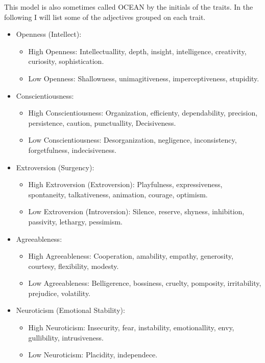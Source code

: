 This model is also sometimes called OCEAN by the initials of the traits. In the following I will list some of the adjectives grouped on each trait.

\begin{itemize}
\item Openness (Intellect):
	\begin{itemize}
	    \item High Openness: Intellectuallity, depth, insight, intelligence, creativity, curiosity, sophistication.
	    \item Low Openness: Shallowness, unimagitiveness, imperceptiveness, stupidity.
	\end{itemize}
\item Conscientiousness:
	\begin{itemize}
	    \item High Conscientiousness: Organization, efficienty, dependability, precision, persistence, caution, punctuallity, Decisiveness.
	    \item Low Conscientiousness: Desorganization, negligence, inconsistency, forgetfulness, indecisiveness. 
	\end{itemize}
\item Extroversion (Surgency):
	\begin{itemize}
	    \item High Extroversion (Extroversion): Playfulness, expressiveness, spontaneity, talkativeness, animation, courage, optimism.
	    \item Low Extroversion (Introversion): Silence, reserve, shyness, inhibition, passivity, lethargy, pessimism.
	\end{itemize}
\item Agreeableness:
	\begin{itemize}
	    \item High Agreeableness: Cooperation, amability, empathy, generosity, courtesy, flexibility, modesty.
	    \item Low Agreeableness: Belligerence, bossiness, cruelty, pomposity, irritability, prejudice, volatility.
	\end{itemize}
\item Neuroticism (Emotional Stability):
	\begin{itemize}
	    \item High Neuroticism: Insecurity, fear, instability, emotionallity, envy, gullibility, intrusiveness.
	    \item Low Neuroticism: Placidity, independece.
	\end{itemize}
\end{itemize}

